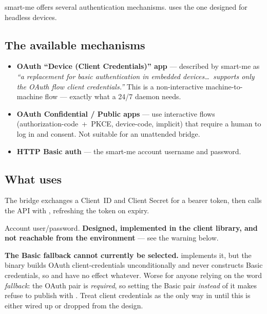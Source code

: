 smart-me offers several authentication mechanisms. \prog uses the one designed for
headless devices.

\subsection{The available mechanisms}
\begin{itemize}
  \item \textbf{OAuth “Device (Client Credentials)” app} — described by smart-me as
        \emph{“a replacement for basic authentication in embedded devices\dots\ supports
        only the OAuth flow client credentials.”} This is a non-interactive
        machine-to-machine flow — exactly what a 24/7 daemon needs.
  \item \textbf{OAuth Confidential / Public apps} — use interactive flows
        (authorization-code~+~PKCE, device-code, implicit) that require a human to log in
        and consent. Not suitable for an unattended bridge.
  \item \textbf{HTTP Basic auth} — the smart-me account username and password.
\end{itemize}

\subsection{What \prog uses}
\begin{description}[style=nextline]
  \item[Primary — OAuth2 Client Credentials] The bridge exchanges a Client~ID and Client
        Secret for a bearer token, then calls the API with
        , refreshing the token on expiry.
  \item[Fallback — HTTP Basic] Account user/password. \textbf{Designed, implemented in the
        client library, and not reachable from the environment} --- see the warning below.
\end{description}

\begin{warning}
\textbf{The Basic fallback cannot currently be selected.}  implements
it, but the binary builds OAuth client-credentials unconditionally and never constructs
Basic credentials, so  and  have
no effect whatever. Worse for anyone relying on the word \emph{fallback}: the OAuth pair is
\emph{required}, so setting the Basic pair \emph{instead} of it makes \prog refuse to publish
with .
Treat client credentials as
the only way in until this is either wired up or dropped from the design.
\end{warning}

